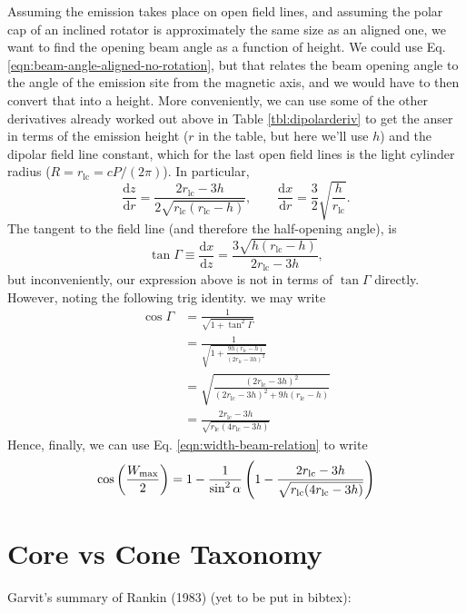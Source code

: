 \documentclass{book}
\newcommand{\deriv}[2]{\frac{\text{d}{#1}}{\text{d}{#2}}}
\newcommand{\rL}{r_\text{lc}} %
\begin{document}
Assuming the emission takes place on open field lines, and assuming the polar cap of an inclined rotator is approximately the same size as an aligned one, we want to find the opening beam angle as a function of height.
We could use Eq. \eqref{eqn:beam-angle-aligned-no-rotation}, but that relates the beam opening angle to the angle of the emission site from the magnetic axis, and we would have to then convert that into a height.
More conveniently, we can use some of the other derivatives already worked out above in Table \ref{tbl:dipolarderiv} to get the anser in terms of the emission height ($r$ in the table, but here we'll use $h$) and the dipolar field line constant, which for the last open field lines is the light cylinder radius ($R = \rL = cP/(2\pi)$).
In particular,
\begin{equation}
  \deriv{z}{r} = \frac{2\rL - 3h}{2\sqrt{\rL(\rL - h)}},
  \qquad
  \deriv{x}{r} = \frac{3}{2} \sqrt{\frac{h}{\rL}}.
\end{equation}
The tangent to the field line (and therefore the half-opening angle), is
\begin{equation}
  \tan\Gamma \equiv \deriv{x}{z}
    = \frac{3\sqrt{h(\rL - h)}}{2\rL - 3h},
\end{equation}
but inconveniently, our expression above is not in terms of $\tan\Gamma$ directly.
However, noting the following trig identity. we may write
\begin{equation}
  \begin{aligned}
    \cos\Gamma
      &= \frac{1}{\sqrt{1 + \tan^2\Gamma}} \\
      &= \frac{1}{\sqrt{1 + \frac{9h(\rL - h)}{(2\rL - 3h)^2}}} \\
      &= \sqrt{\frac{(2\rL - 3h)^2}{(2\rL - 3h)^2 + 9h(\rL - h)}} \\
      &= \frac{2\rL - 3h}{\sqrt{\rL(4\rL - 3h)}}
  \end{aligned}
\end{equation}
Hence, finally, we can use Eq. \eqref{eqn:width-beam-relation} to write
\begin{equation}
  \cos\bigg(\frac{W_{\rm max}}{2}\bigg)
    = 1 - \frac{1}{\sin^2\alpha}\left( 1 - \frac{2\rL - 3h}{\sqrt{\rL(4\rL - 3h)}} \right)
\end{equation}

\section{Core vs Cone Taxonomy}

Garvit's summary of Rankin (1983) (yet to be put in bibtex):
\end{document}
